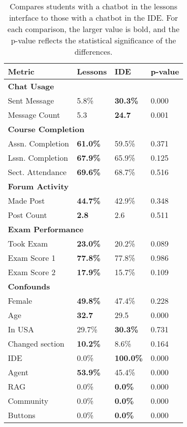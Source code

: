\begin{table}
\centering
\begin{tabularx}{\columnwidth}{l X X X}
\toprule
\textbf{Metric} & \textbf{Lessons} & \textbf{IDE} & \textbf{p-value} \\
\midrule
\multicolumn{4}{l}{\textbf{Chat Usage}} \\
Sent Message & 5.8\% & \textbf{30.3\%} & 0.000 \\
Message Count & 5.3 & \textbf{24.7} & 0.001 \\
\midrule
\multicolumn{4}{l}{\textbf{Course Completion}} \\
Assn. Completion & \textbf{61.0\%} & 59.5\% & 0.371 \\
Lssn. Completion & \textbf{67.9\%} & 65.9\% & 0.125 \\
Sect. Attendance & \textbf{69.6\%} & 68.7\% & 0.516 \\
\midrule
\multicolumn{4}{l}{\textbf{Forum Activity}} \\
Made Post & \textbf{44.7\%} & 42.9\% & 0.348 \\
Post Count & \textbf{2.8} & 2.6 & 0.511 \\
\midrule
\multicolumn{4}{l}{\textbf{Exam Performance}} \\
Took Exam & \textbf{23.0\%} & 20.2\% & 0.089 \\
Exam Score 1 & \textbf{77.8\%} & 77.8\% & 0.986 \\
Exam Score 2 & \textbf{17.9\%} & 15.7\% & 0.109 \\
\midrule
\multicolumn{4}{l}{\textbf{Confounds}} \\
Female & \textbf{49.8\%} & 47.4\% & 0.228 \\
Age & \textbf{32.7} & 29.5 & 0.000 \\
In USA & 29.7\% & \textbf{30.3\%} & 0.731 \\
Changed section & \textbf{10.2\%} & 8.6\% & 0.164 \\
IDE & 0.0\% & \textbf{100.0\%} & 0.000 \\
Agent & \textbf{53.9\%} & 45.4\% & 0.000 \\
RAG & 0.0\% & \textbf{0.0\%} & 0.000 \\
Community & 0.0\% & \textbf{0.0\%} & 0.000 \\
Buttons & 0.0\% & \textbf{0.0\%} & 0.000 \\
\bottomrule
\end{tabularx}
\caption{Compares students with a chatbot in the lessons interface to those with a chatbot in the IDE. For each comparison, the larger value is bold, and the p-value reflects the statistical significance of the differences.}
\label{tab:placement-table-complete}
\end{table}
